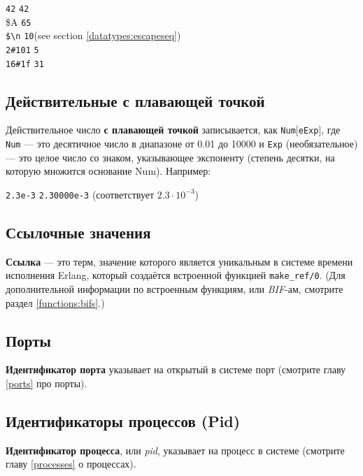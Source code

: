 \texttt{42} \resultingin \texttt{42} \\
\$A  \resultingin \texttt{65} \\
\texttt{\$\textbackslash n} \resultingin \texttt{10}\hfill(see section \ref{datatypes:escapeseq}) \\
\texttt{2\#101} \resultingin \texttt{5} \\
\texttt{16\#1f} \resultingin \texttt{31}


\subsection{Действительные с плавающей точкой}
\label{datatypes:float}

Действительное число \textbf{с плавающей точкой} записывается, как 
\texttt{Num}[\texttt{eExp}], где \texttt{Num} --- это десятичное число в диапазоне 
от 0.01 до 10000 и \texttt{Exp} (необязательное) --- это целое число со знаком,
указывающее экспоненту (степень десятки, на которую множится основание Num). 
Например:

\texttt{2.3e-3} \resultingin \texttt{2.30000e-3}\hfill
(соответствует $2.3 \cdot 10^{-3}$)


\subsection{Ссылочные значения}
\label{datatypes:reference}

\textbf{Ссылка} --- это терм, значение которого является уникальным в системе 
времени исполнения Erlang, который создаётся встроенной функцией 
\texttt{make\_ref/0}. (Для дополнительной информации по встроенным функциям,
или \textit{BIF}-ам, смотрите раздел \ref{functions:bifs}.)


\subsection{Порты}
\label{datatypes:port}

\textbf{Идентификатор порта} указывает на открытый в системе порт (смотрите главу
\ref{ports} про порты).


\subsection{Идентификаторы процессов (Pid)}
\label{datatypes:pid}

\textbf{Идентификатор процесса}, или \textit{pid}, указывает на процесс в системе 
(смотрите главу \ref{processes} о процессах).


